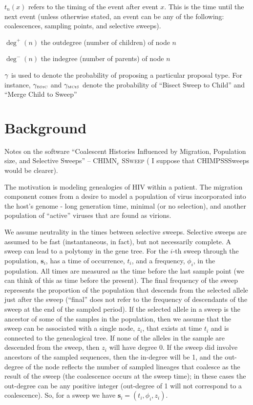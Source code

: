 \documentclass[letterpaper]{article}
\newcommand{\subscript}[1]{\ensuremath{_{#1}}}
\newcommand{\chimnesweep}[0]{\textsc{CHIMN\subscript{e} SSweep}}
\newcommand{\chimnesweeps}[0]{{\chimnesweep} }
\newcommand{\sweep}[1]{{\ensuremath{\mathbf{s}_{#1}}}}
\newcommand{\sweeptime}[1]{{\ensuremath{t_{#1}}}}
\newcommand{\sweepfreq}[1]{{\ensuremath{\phi_{#1}}}}
\newcommand{\sweeploc}[1]{{\ensuremath{z_{#1}}}}
\newcommand{\timeNext}[1]{{\ensuremath{t_n(#1)}}}
\newcommand{\outdegree}[1]{{\ensuremath{\deg^{+}\left(#1\right)}}}
\newcommand{\indegree}[1]{{\ensuremath{\deg^{-}\left(#1\right)}}}
\newcommand{\propProb}[1]{{\ensuremath{\gamma_{\mbox{\tiny #1}}}}}
\begin{document}
\begin{compactitem}
	 \item[$\timeNext{x}$] refers to the timing of the event after event $x$. This is the time until the next event (unless otherwise stated, an event can be any of the following: coalescences, sampling points, and selective sweeps).
	 \item[$\outdegree{n}$] the outdegree (number of children) of node $n$
	 \item[$\indegree{n}$] the indegree (number of parents) of node $n$
	 \item[$\propProb{}$] is used to denote the probability of proposing a particular proposal type.  For instance, $\propProb{BStC}$ and $\propProb{MCtS}$ denote the probability of ``Bisect Sweep to Child'' and ``Merge Child to Sweep''
\end{compactitem}
 
\section{Background}
Notes on the software ``Coalescent Histories Influenced by Migration, Population size, and Selective Sweeps'' -- \chimnesweeps ( I suppose that CHIMPSSSweeps would be clearer).

The motivation is modeling genealogies of HIV within a patient.
The migration component comes from a desire to model a population of virus incorporated into the host's genome - long generation time, minimal (or no selection), and another population of ``active'' viruses that are found as virions. 

We assume neutrality in the times between selective sweeps.
Selective sweeps are assumed to be fast (instantaneous, in fact), but not necessarily complete.
A sweep can lead to a polytomy in the gene tree.
For the $i$-th sweep through the population, $\sweep{i}$, has a time of occurrence, $\sweeptime{i}$, and a frequency, $\sweepfreq{i}$, in the population. 
All times are measured as the time before the  last sample point (we can think of this as time before the present).
The final frequency of the sweep represents the proportion of the population that descends from the selected allele just after the sweep (``final'' does not refer to the frequency of descendants of the sweep at the end of the sampled period).
If the selected allele in a sweep is the ancestor of some of the samples in the population, then we assume that the sweep can be associated with a single node, $\sweeploc{i}$, that exists at time $\sweeptime{i}$ and is connected to the genealogical tree.
If none of the alleles in the sample are descended from the sweep, then $\sweeploc{i}$ will have degree 0.
If the sweep did involve ancestors of the sampled sequences, then the in-degree will be 1, and the out-degree of the node reflects the number of sampled lineages that coalesce as the result of the sweep (the coalescence occurs at the sweep time); in these cases the out-degree can be any positive integer (out-degree of 1 will not correspond to a coalescence).
So, for a sweep we have $\sweep{i} = (\sweeptime{i},\sweepfreq{i}, \sweeploc{i})$.
\end{document}
